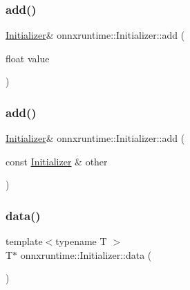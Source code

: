 \subsubsection{\texorpdfstring{add()}{add()}\hspace{0.1cm}{\footnotesize\ttfamily [1/2]}}
{\footnotesize\ttfamily \mbox{\hyperlink{classonnxruntime_1_1Initializer}{Initializer}}\& onnxruntime\+::\+Initializer\+::add (\begin{DoxyParamCaption}\item[{float}]{value }\end{DoxyParamCaption})\hspace{0.3cm}{\ttfamily [inline]}}

\mbox{\label{classonnxruntime_1_1Initializer_af7ae55957c741495c4520f29ff2381ca}} 
\subsubsection{\texorpdfstring{add()}{add()}\hspace{0.1cm}{\footnotesize\ttfamily [2/2]}}
{\footnotesize\ttfamily \mbox{\hyperlink{classonnxruntime_1_1Initializer}{Initializer}}\& onnxruntime\+::\+Initializer\+::add (\begin{DoxyParamCaption}\item[{const \mbox{\hyperlink{classonnxruntime_1_1Initializer}{Initializer}} \&}]{other }\end{DoxyParamCaption})\hspace{0.3cm}{\ttfamily [inline]}}

\mbox{\label{classonnxruntime_1_1Initializer_abc96d698ae7eb8006c85bd42e2962a67}} 
\subsubsection{\texorpdfstring{data()}{data()}\hspace{0.1cm}{\footnotesize\ttfamily [1/2]}}
{\footnotesize\ttfamily template$<$typename T $>$ \\
T$\ast$ onnxruntime\+::\+Initializer\+::data (\begin{DoxyParamCaption}{ }\end{DoxyParamCaption})\hspace{0.3cm}{\ttfamily [inline]}}

